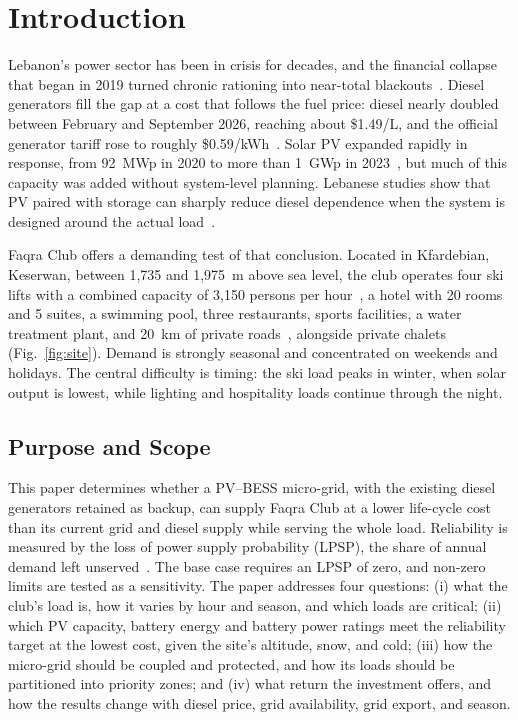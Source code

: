 \section{Introduction}

Lebanon's power sector has been in crisis for decades, and the financial collapse that began in 2019 turned chronic rationing into near-total blackouts~\cite{tarnini2023}. Diesel generators fill the gap at a cost that follows the fuel price: diesel nearly doubled between February and September 2026, reaching about \$1.49/L, and the official generator tariff rose to roughly \$0.59/kWh~\cite{lorient2026}. Solar PV expanded rapidly in response, from 92~MWp in 2020 to more than 1~GWp in 2023~\cite{lcec2025}, but much of this capacity was added without system-level planning. Lebanese studies show that PV paired with storage can sharply reduce diesel dependence when the system is designed around the actual load~\cite{chedid2020,tarnini2023}.

Faqra Club offers a demanding test of that conclusion. Located in Kfardebian, Keserwan, between 1,735 and 1,975~m above sea level, the club operates four ski lifts with a combined capacity of 3,150 persons per hour~\cite{skiresort}, a hotel with 20 rooms and 5 suites, a swimming pool, three restaurants, sports facilities, a water treatment plant, and 20~km of private roads~\cite{faqraabout}, alongside private chalets (Fig.~\ref{fig:site}). Demand is strongly seasonal and concentrated on weekends and holidays. The central difficulty is timing: the ski load peaks in winter, when solar output is lowest, while lighting and hospitality loads continue through the night.

\subsection{Purpose and Scope}
This paper determines whether a PV--BESS micro-grid, with the existing diesel generators retained as backup, can supply Faqra Club at a lower life-cycle cost than its current grid and diesel supply while serving the whole load. Reliability is measured by the loss of power supply probability (LPSP), the share of annual demand left unserved~\cite{yang2008}. The base case requires an LPSP of zero, and non-zero limits are tested as a sensitivity. The paper addresses four questions: (i) what the club's load is, how it varies by hour and season, and which loads are critical; (ii) which PV capacity, battery energy and battery power ratings meet the reliability target at the lowest cost, given the site's altitude, snow, and cold; (iii) how the micro-grid should be coupled and protected, and how its loads should be partitioned into priority zones; and (iv) what return the investment offers, and how the results change with diesel price, grid availability, grid export, and season.

